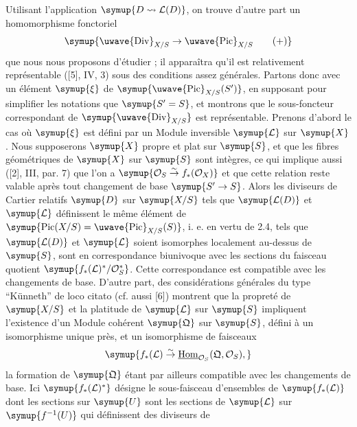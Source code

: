 Utilisant l'application $\symup{D\rightsquigarrow\mathcal L(D)}$, on trouve d'autre part un
homomorphisme fonctoriel
\begin{equation}
\symup{\text{\uwave{Div}}_{X/S}\to\text{\uwave{Pic}}_{X/S}
\tag{+}}
\end{equation}
que nous nous proposons d'étudier ; il apparaîtra qu'il est relativement
représentable ([5], IV, 3) sous des conditions assez générales. Partons donc
avec un élément $\symup{\xi}$ de $\symup{\text{\uwave{Pic}}_{X/S}(S')}$, en supposant pour
simplifier les notations que $\symup{S'=S}$, et montrons que le sous-foncteur
correspondant de $\symup{\text{\uwave{Div}}_{X/S}}$ est représentable. Prenons d'abord
le cas où $\symup{\xi}$ est défini par un Module inversible $\symup{\mathcal L}$ sur $\symup{X}$. Nous
supposerons $\symup{X}$ propre et plat sur $\symup{S}$, et que les fibres géométriques de $\symup{X}$
sur $\symup{S}$ sont intègres, ce qui implique aussi ([2], III, par. 7) que l'on a
$\symup{\mathcal O_S\overset{\sim}{\to}f_*(\mathcal O_X)}$ et que cette relation reste
valable après tout changement de base $\symup{S'\to S}$. Alors les
diviseurs de Cartier relatifs $\symup{D}$ sur $\symup{X/S}$ tels que $\symup{\mathcal L(D)}$ et
$\symup{\mathcal L}$ définissent le même élément de
$\symup{\operatorname{Pic}(X/S)=\text{\uwave{Pic}}_{X/S}(S)}$, i. e. en vertu de 2.4,
tels que $\symup{\mathcal L(D)}$ et $\symup{\mathcal L}$ soient isomorphes localement au-dessus
de $\symup{S}$, sont en correspondance biunivoque avec les sections du faisceau
quotient $\symup{f_*(\mathcal L)^*/\mathcal O_S^*}$. Cette correspondance est compatible
avec les changements de base. D'autre part, des considérations générales du
type ``Künneth'' de loco citato (cf. aussi [6]) montrent que la propreté de
$\symup{X/S}$ et la platitude de $\symup{\mathcal L}$ sur $\symup{S}$ impliquent l'existence d'un Module
cohérent $\symup{\mathfrak Q}$ sur $\symup{S}$, défini à un isomorphisme unique près, et un
isomorphisme de faisceaux
\[
\symup{f_*(\mathcal L)\overset{\sim}{\to}
\underline{\operatorname{Hom}}_{\mathcal O_S}(\mathfrak Q,\mathcal O_S),}
\]
la formation de $\symup{\mathfrak Q}$ étant par ailleurs
compatible avec les changements de base. Ici $\symup{f_*(\mathcal L)^*}$ désigne le
sous-faisceau d'ensembles de $\symup{f_*(\mathcal L)}$ dont les sections sur $\symup{U}$ sont
les sections de $\symup{\mathcal L}$ sur $\symup{f^{-1}(U)}$ qui définissent des diviseurs de

